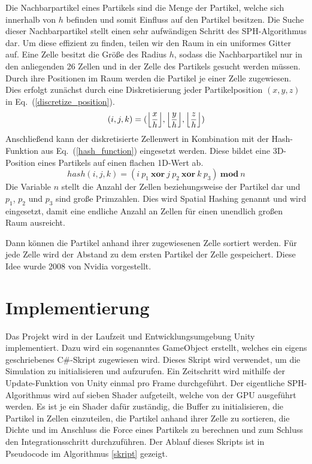 \documentclass[a4paper]{paper}
\renewcommand{\eqref}[1]{Eq.~(\ref{#1})}
\DeclarePairedDelimiter\floor{\lfloor}{\rfloor}
\begin{document}
Die Nachbarpartikel eines Partikels sind die Menge der Partikel, welche sich innerhalb von $h$ befinden und somit Einfluss auf den Partikel besitzen. Die Suche dieser Nachbarpartikel stellt einen sehr aufwändigen Schritt des SPH-Algorithmus dar. Um diese effizient zu finden, teilen wir den Raum in ein uniformes Gitter auf. Eine Zelle besitzt die Größe des Radius $h$, sodass die Nachbarpartikel nur in den anliegenden 26 Zellen und in der Zelle des Partikels gesucht werden müssen. Durch ihre Positionen im Raum werden die Partikel je einer Zelle zugewiesen. Dies erfolgt zunächst durch eine Diskretisierung jeder Partikelposition $(x,y,z)$ in \eqref{discretize_position}. 
\begin{equation}
\label{discretize_position}
(i, j, k) = (\floor*{\frac{x}{h}}, \floor*{\frac{y}{h}}, \floor*{\frac{z}{h}})
\end{equation}
Anschließend kann der diskretisierte Zellenwert in Kombination mit der Hash-Funktion aus \eqref{hash_function} eingesetzt werden. Diese bildet eine 3D-Position eines Partikels auf einen flachen 1D-Wert ab.
\begin{equation}
\label{hash_function}
hash(i,j,k) = (i\ p_1 \ \boldsymbol{xor} \ j\ p_2\ \boldsymbol{xor}\ k\ p_3)\ \boldsymbol{mod}\ n
\end{equation}
Die Variable $n$ stellt die Anzahl der Zellen beziehungsweise der Partikel dar und $p_1$, $p_2$ und $p_3$ sind große Primzahlen. Dies wird Spatial Hashing genannt und wird eingesetzt, damit eine endliche Anzahl an Zellen für einen unendlich großen Raum ausreicht. \citep{muller2003optimized}

Dann können die Partikel anhand ihrer zugewiesenen Zelle sortiert werden. Für jede Zelle wird der Abstand zu dem ersten Partikel der Zelle gespeichert. Diese Idee wurde 2008 von Nvidia vorgestellt. \citep{Nvidia}


\section{Implementierung}
Das Projekt wird in der Laufzeit und Entwicklungsumgebung Unity implementiert. Dazu wird ein sogenanntes GameObject erstellt, welches ein eigens geschriebenes C\#-Skript zugewiesen wird. Dieses Skript wird verwendet, um die Simulation zu initialisieren und aufzurufen. %
Ein Zeitschritt wird mithilfe der Update-Funktion von Unity einmal pro Frame durchgeführt. Der eigentliche SPH-Algorithmus wird auf sieben Shader aufgeteilt, welche von der GPU ausgeführt werden. Es ist je ein Shader dafür zuständig, die Buffer zu initialisieren, die Partikel in Zellen einzuteilen, die Partikel anhand ihrer Zelle zu sortieren, die Dichte und im Anschluss die Force eines Partikels zu berechnen und zum Schluss den Integrationsschritt durchzuführen. Der Ablauf dieses Skripts ist in Pseudocode im Algorithmus \ref{skript} gezeigt.
\end{document}
